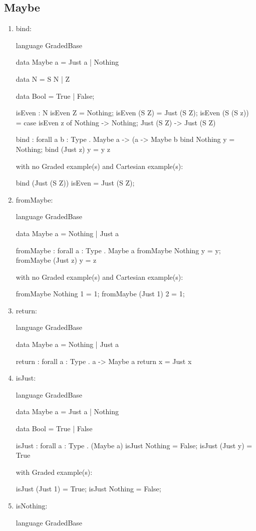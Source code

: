 \subsection{Maybe}
\begin{enumerate}
\item bind: 
\begin{granule}
language GradedBase

data Maybe a = Just a | Nothing

data N = S N | Z

data Bool = True | False; 

isEven : N %
isEven Z = Nothing;
isEven (S Z) = Just (S Z);
isEven (S (S z)) = 
    case isEven z of 
        Nothing -> Nothing;
        Just (S Z) -> Just (S Z)

bind : forall { a b : Type }
     . Maybe a %
     -> (a %
     -> Maybe b
bind Nothing y = Nothing;
bind (Just z) y = y z
\end{granule}
with no Graded example(s) and Cartesian example(s):
\begin{granule}
bind (Just (S Z)) isEven = Just (S Z);
\end{granule}
\item fromMaybe: 
\begin{granule}
language GradedBase

data Maybe a = Nothing | Just a

fromMaybe : forall { a : Type } . Maybe a %
fromMaybe Nothing y = y;
fromMaybe (Just z) y = z
\end{granule}
with no Graded example(s) and Cartesian example(s):
\begin{granule}
fromMaybe  Nothing 1 = 1;
fromMaybe (Just 1) 2 = 1;
\end{granule}
\item return: 
\begin{granule}
language GradedBase

data Maybe a = Nothing | Just a

return : forall { a : Type } . a -> Maybe a
return x = Just x
\end{granule}
\item isJust: 
\begin{granule}
language GradedBase

data Maybe a = Just a | Nothing 

data Bool = True | False 

isJust : forall { a : Type } . (Maybe a) %
isJust Nothing = False;
isJust (Just y) = True
\end{granule}
with Graded example(s):
\begin{granule}
isJust (Just 1) = True;
isJust Nothing = False;
\end{granule}
\item isNothing: 
\begin{granule}
language GradedBase


\end{granule}
\end{enumerate}
